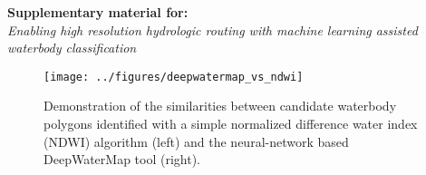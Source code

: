 \documentclass[12pt]{article}
\begin{document}
\begin{center}
\textbf{Supplementary material for:}\\
\emph{Enabling high resolution hydrologic routing with machine learning assisted waterbody classification}
\end{center}

\begin{figure}[h!]
    \begin{center}
          \texttt{[image: ../figures/deepwatermap\_vs\_ndwi]}
          \caption{Demonstration of the similarities between candidate waterbody polygons identified with a simple normalized difference water index (NDWI) algorithm (left) and the neural-network based DeepWaterMap tool (right).}
    \end{center}    
\end{figure}

\clearpage
\end{document}
